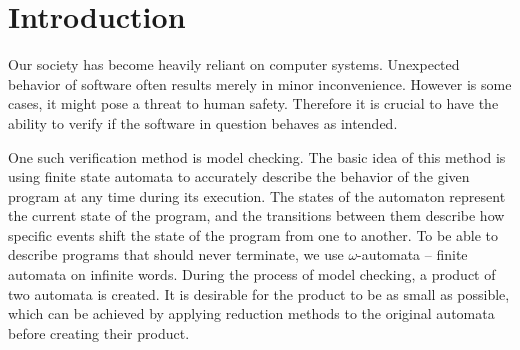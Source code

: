\documentclass[
  digital, %
  twoside, %
  table,   %
  lof,     %
  lot,     %
]{fithesis3}
\begin{document}

\newcommand{\accmarkblue}{\begin{tikzpicture} \node[accset, collacc0] {}; \end{tikzpicture}}
\newcommand{\accmarkmag}{\begin{tikzpicture} \node[accset, collacc1] {}; \end{tikzpicture}}
\newcommand{\accmarkor}{\begin{tikzpicture} \node[accset, collacc2] {}; \end{tikzpicture}}
\newcommand{\accsquaregr}{\begin{tikzpicture} \node[accsquare, collacc3] {}; \end{tikzpicture}}
\newcommand{\accsquareblue}{\begin{tikzpicture} \node[accsquare, collacc0] {}; \end{tikzpicture}}
\newcommand{\accsquaremag}{\begin{tikzpicture} \node[accsquare, collacc1] {}; \end{tikzpicture}}

\chapter{Introduction}
Our society has become heavily reliant on computer systems. Unexpected behavior of software often results merely in minor inconvenience. However is some cases, it might pose a threat to human safety. Therefore it is crucial to have the ability to verify if the software in question behaves as intended. 

One such verification method is model checking. The basic idea of this method is using finite state automata to accurately describe the behavior of the given program at any time during its execution. The states of the automaton represent the current state of the program, and the transitions between them describe how specific events shift the state of the program from one to another. To be able to describe programs that should never terminate, we use $\omega$-automata -- finite automata on infinite words. During the process of model checking, a product of two automata is created. It is desirable for the product to be as small as possible, which can be achieved by applying reduction methods to the original automata before creating their product.
\end{document}
